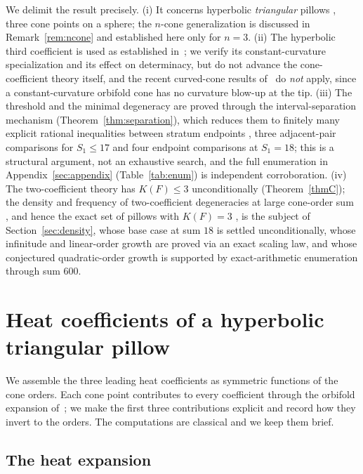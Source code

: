 \documentclass[12pt, letterpaper]{article}
\theoremstyle{definition}
\theoremstyle{plain}
\begin{document}
We delimit the result precisely. (i) It concerns hyperbolic \emph{triangular} pillows ,  three cone points on a sphere; the $n$-cone generalization is discussed in Remark~\ref{rem:ncone} and established here only for $n=3$. (ii) The hyperbolic third coefficient is used as established in~\cite{dggw2008, schueth2019, ucar2017}; we verify its constant-curvature specialization and its effect on determinacy, but do not advance the cone-coefficient theory itself, and the recent curved-cone results of~\cite{schueth2025} do \emph{not} apply, since a constant-curvature orbifold cone has no curvature blow-up at the tip. (iii) The threshold and the minimal degeneracy are proved through the interval-separation mechanism (Theorem~\ref{thm:separation}), which reduces them to finitely many explicit rational inequalities between stratum endpoints ,  three adjacent-pair comparisons for $S_1\le17$ and four endpoint comparisons at $S_1=18$; this is a structural argument, not an exhaustive search, and the full enumeration in Appendix~\ref{sec:appendix} (Table~\ref{tab:enum}) is independent corroboration. (iv) The two-coefficient theory has $K(F)\le3$ unconditionally (Theorem~\ref{thmC}); the density and frequency of two-coefficient degeneracies at large cone-order sum ,  and hence the exact set of pillows with $K(F)=3$ ,  is the subject of Section~\ref{sec:density}, whose base case at sum $18$ is settled unconditionally, whose infinitude and linear-order growth are proved via an exact scaling law, and whose conjectured quadratic-order growth is supported by exact-arithmetic enumeration through sum $600$.

\newpage
\section{Heat coefficients of a hyperbolic triangular pillow}
\label{sec:core}

We assemble the three leading heat coefficients as symmetric functions of the cone orders. Each cone point contributes to every coefficient through the orbifold expansion of~\cite{dggw2008}; we make the first three contributions explicit and record how they invert to the orders. The computations are classical and we keep them brief.

\subsection{The heat expansion}
\label{sec:heatexp}
\end{document}
